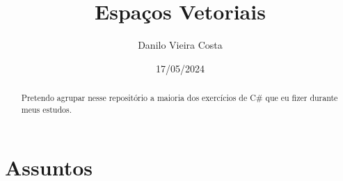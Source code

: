 \documentclass[12pt]{article}
\title{Espaços Vetoriais}
\author{Danilo Vieira Costa}
\date{17/05/2024}
\begin{document}
\maketitle

\begin{abstract}
Pretendo agrupar nesse repositório a maioria dos exercícios de C\# que eu fizer durante meus estudos. 
\end{abstract}

\section{Assuntos}
\end{document}
